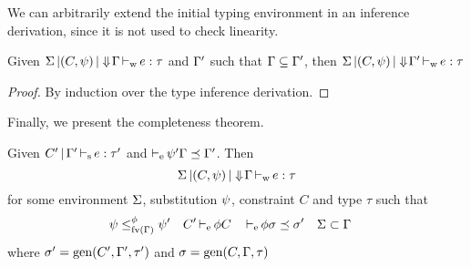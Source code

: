 We can arbitrarily extend the initial typing environment in an inference
derivation, since
it is not used to check linearity.

\begin{lemma}
  \label{infer:extend}
  Given $\Sigma \operatorname{|} (C,\mathrm{\psi}) \operatorname{|} \Downarrow\!\Gamma \operatorname{\vdash_w} e : \tau$ and $\Gamma'$ such
  that $\Gamma \subseteq \Gamma'$, then $\Sigma \operatorname{|} (C,\mathrm{\psi}) \operatorname{|} \Downarrow\!\Gamma' \operatorname{\vdash_w} e : \tau$
  \begin{proof}
    By induction over the type inference derivation.
  \end{proof}
\end{lemma}

Finally, we present the completeness theorem.

\begin{theorem}[Completeness]
  Given $C' \operatorname{|} \Gamma' \operatorname{\vdash_s} e : \tau'$ and
  $\operatorname{\vdash_e} \mathrm{\psi}'\Gamma \preceq \Gamma'$.
  Then $$\Sigma \operatorname{|} (C,\mathrm{\psi}) \operatorname{|} \Downarrow\!\Gamma \operatorname{\vdash_w} e : \tau$$
  for some environment $\Sigma$,
  substitution $\mathrm{\psi}$, constraint $C$ and type $\tau$ such
  that
  \begin{align*}
    \mathrm{\psi} &\leq^{\phi}_{\operatorname{fv}(\Gamma)} \mathrm{\psi}'
    &C'& \operatorname{\vdash_e} \phi C
    && \operatorname{\vdash_e} \phi \sigma \preceq \sigma'
    &\Sigma&\subset\Gamma
  \end{align*}
  where $\sigma' = \operatorname{\text{gen}}(C',\Gamma',\tau')$
  and $\sigma = \operatorname{\text{gen}}(C,\Gamma,\tau)$
\end{theorem}
